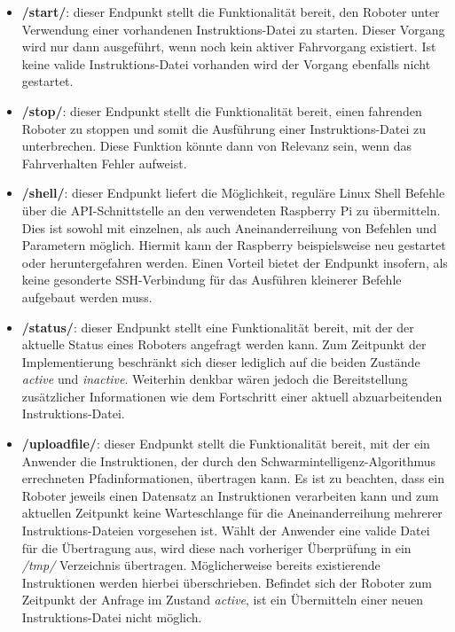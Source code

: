 \begin{itemize}
  \item \textbf{/start/}: dieser Endpunkt stellt die Funktionalität bereit, den Roboter unter Verwendung einer vorhandenen Instruktions-Datei zu starten. Dieser Vorgang wird nur dann ausgeführt, wenn noch kein aktiver Fahrvorgang existiert. Ist keine valide Instruktions-Datei vorhanden wird der Vorgang ebenfalls nicht gestartet.
  \item \textbf{/stop/}: dieser Endpunkt stellt die Funktionalität bereit, einen fahrenden Roboter zu stoppen und somit die Ausführung einer Instruktions-Datei zu unterbrechen. Diese Funktion könnte dann von Relevanz sein, wenn das Fahrverhalten Fehler aufweist.
  \item \textbf{/shell/}: dieser Endpunkt liefert die Möglichkeit, reguläre Linux Shell Befehle über die API-Schnittstelle an den verwendeten Raspberry Pi zu übermitteln. Dies ist sowohl mit einzelnen, als auch Aneinanderreihung von Befehlen und Parametern möglich. Hiermit kann der Raspberry beispielsweise neu gestartet oder heruntergefahren werden. Einen Vorteil bietet der Endpunkt insofern, als keine gesonderte SSH-Verbindung für das Ausführen kleinerer Befehle aufgebaut werden muss.
  \item \textbf{/status/}: dieser Endpunkt stellt eine Funktionalität bereit, mit der der aktuelle Status eines Roboters angefragt werden kann. Zum Zeitpunkt der Implementierung beschränkt sich dieser lediglich auf die beiden Zustände \textit{active} und \textit{inactive}. Weiterhin denkbar wären jedoch die Bereitstellung zusätzlicher Informationen wie dem Fortschritt einer aktuell abzuarbeitenden Instruktions-Datei.
  \item \textbf{/uploadfile/}: dieser Endpunkt stellt die Funktionalität bereit, mit der ein Anwender die Instruktionen, der durch den Schwarmintelligenz-Algorithmus errechneten Pfadinformationen, übertragen kann. Es ist zu beachten, dass ein Roboter jeweils einen Datensatz an Instruktionen verarbeiten kann und zum aktuellen Zeitpunkt keine Warteschlange für die Aneinanderreihung mehrerer Instruktions-Dateien vorgesehen ist. Wählt der Anwender eine valide Datei für die Übertragung aus, wird diese nach vorheriger Überprüfung in ein  \textit{/tmp/} Verzeichnis übertragen. Möglicherweise bereits existierende Instruktionen werden hierbei überschrieben. Befindet sich der Roboter zum Zeitpunkt der Anfrage im Zustand \textit{active}, ist ein Übermitteln einer neuen Instruktions-Datei nicht möglich. 
\end{itemize}

